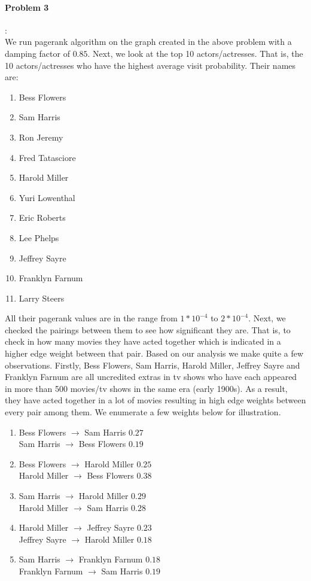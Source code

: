 \documentclass{article}
\begin{document}
\paragraph{Problem 3}:\\
We run pagerank algorithm on the graph created in the above problem with a damping factor of $0.85$.
Next, we look at the top 10 actors/actresses. That is, the 10 actors/actresses who have the highest average visit
probability. Their names are:
\begin{enumerate}
 \item 
Bess Flowers   
\item 
Sam Harris
\item
Ron Jeremy 
\item
Fred Tatasciore
\item
Harold Miller
\item
Yuri Lowenthal
\item
Eric Roberts
\item
Lee Phelps
\item
Jeffrey Sayre
\item
Franklyn Farnum
\item
Larry Steers
\end{enumerate}
All their pagerank values are in the range from $1*10^{-4}$ to $2*10^{-4}$.
Next, we checked the pairings between them to see how significant they are. That is, to check in how many movies they
have acted together which is indicated in a higher edge weight between that pair. Based on our analysis we make quite a few observations. Firstly, Bess Flowers, Sam Harris, 
Harold Miller, Jeffrey Sayre and Franklyn Farnum are all uncredited extras in tv shows who have each appeared in more than
500 movies/tv shows in the same era (early 1900s). As a result, they have acted together in a lot of movies resulting in high 
edge weights between every pair among them. We enumerate a few weights below for illustration.
\begin{enumerate}
 \item 
 Bess Flowers $\rightarrow$ Sam Harris $0.27$\\
 Sam Harris $\rightarrow$ Bess Flowers $0.19$
 \item
 Bess Flowers $\rightarrow$ Harold Miller $0.25$\\
 Harold Miller $\rightarrow$ Bess Flowers $0.38$
 \item
  Sam Harris $\rightarrow$ Harold Miller $0.29$\\
 Harold Miller $\rightarrow$ Sam Harris $0.28$
 \item
 Harold Miller $\rightarrow$ Jeffrey Sayre $0.23$\\
 Jeffrey Sayre $\rightarrow$ Harold Miller $0.18$
 \item
 Sam Harris $\rightarrow$ Franklyn Farnum $0.18$\\
 Franklyn Farnum $\rightarrow$ Sam Harris $0.19$
 \end{enumerate}
\end{document}
